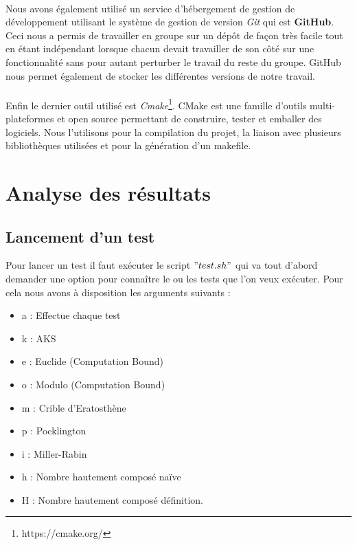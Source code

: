 		\paragraph{}Nous avons également utilisé un service d’hébergement de gestion de développement utilisant le système de gestion de version \textit{Git} qui est \textbf{GitHub}. Ceci nous a permis de travailler en groupe sur un dépôt de façon très facile tout en étant indépendant lorsque chacun devait travailler de son côté sur une fonctionnalité sans pour autant perturber le travail du reste du groupe. GitHub nous permet également de stocker les différentes versions de notre travail.   
		\paragraph{}Enfin le dernier outil utilisé est \textit{Cmake}\footnote{https://cmake.org/}. CMake est une famille d'outils multi-plateformes et open source permettant de construire, tester et emballer des logiciels. Nous l'utilisons pour la compilation du projet, la liaison avec plusieurs bibliothèques utilisées et pour la génération d'un makefile. 
			
	\section{Analyse des résultats}
		\subsection{Lancement d'un test}
	Pour lancer un test il faut exécuter le script $"test.sh"$ qui va tout d'abord demander une option pour connaître le ou les tests que l'on veux exécuter. Pour cela nous avons à disposition les arguments suivants : 
	\begin{itemize}
		\item a : Effectue chaque test
		\item k : AKS
		\item e : Euclide (Computation Bound)
		\item o : Modulo (Computation Bound)
		\item m : Crible d'Eratosthène
		\item p : Pocklington
		\item i : Miller-Rabin
		\item h : Nombre hautement composé naïve
		\item H : Nombre hautement composé définition.
	\end{itemize}
	
